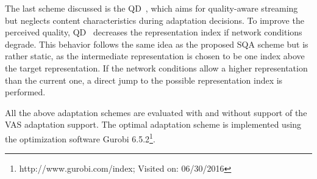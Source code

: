 The last scheme discussed is the \ac{QD}~\cite{Mok2012}, which aims for quality-aware streaming but neglects content characteristics during adaptation decisions. 
To improve the perceived quality, \ac{QD}~\cite{Mok2012} decreases the representation index if network conditions degrade. 
This behavior follows the same idea as the proposed \ac{SQA} scheme but is rather static, as the intermediate representation is chosen to be one index above the target representation.
If the network conditions allow a higher representation than the current one, a direct jump to the possible representation index is performed.  

All the above adaptation schemes are evaluated with and without support of the \ac{VAS} adaptation support. 
The optimal adaptation scheme is implemented using the optimization software Gurobi 6.5.2\footnote{http://www.gurobi.com/index; Visited on: 06/30/2016}.
